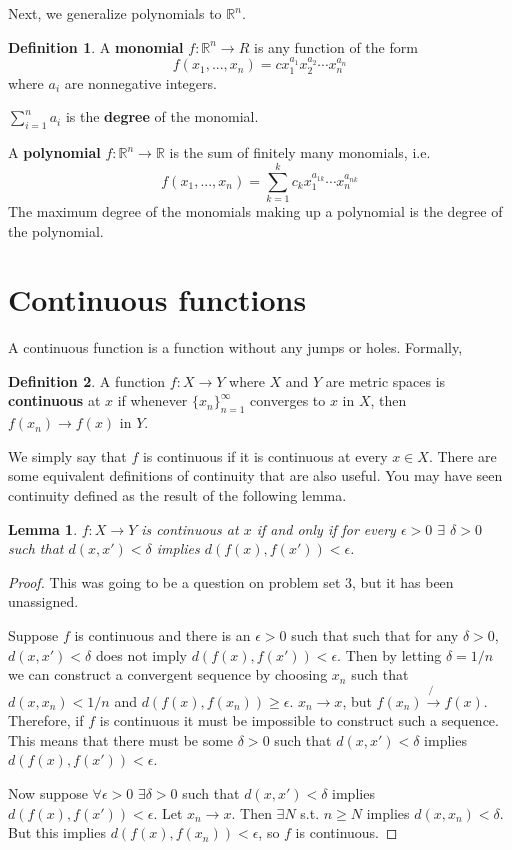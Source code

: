 \documentclass[12pt,reqno]{amsart}
\newtheorem{lemma}{Lemma}[section]
\theoremstyle{definition}
\newtheorem{definition}{Definition}[section]
\def\R{\mathbb{R}}
\newcommand{\seq}[1]{\{{#1}_n \}_{n=1}^\infty }
\renewcommand{\to}{{\rightarrow}}
\begin{document}
Next, we generalize polynomials to $\R^n$. 
\begin{definition}
  A \textbf{monomial} $f:\R^n \to R$ is any function of the form
  \[ f(x_1, ..., x_n) = c x_1^{a_1} x_2^{a_2} \cdots x_n^{a_n} \]
  where $a_i$ are nonnegative integers. 

  $\sum_{i=1}^n a_i$ is the \textbf{degree} of the monomial. 

  A \textbf{polynomial} $f:\R^n \to \R$ is the sum of finitely many
  monomials, i.e.
  \[ f(x_1, ..., x_n) = \sum_{k=1}^k c_k x_1^{a_{1k}}\cdots
  x_n^{a_{nk}} \]
  The maximum degree of the monomials making up a polynomial is the
  degree of the polynomial.
\end{definition}

\section{Continuous functions}

A continuous function is a function without any jumps or
holes. Formally,
\begin{definition}
  A function $f:X \to Y$ where $X$ and $Y$ are metric spaces is
  \textbf{continuous} at $x$ if whenever $\seq{x}$ converges to $x$ in
  $X$, then $f(x_n) \to f(x)$ in $Y$.  
\end{definition}
We simply say that $f$ is continuous if it is continuous at every $x
\in X$.  There are some equivalent definitions of continuity that are
also useful. You may have seen continuity defined as the result of the
following lemma.
\begin{lemma}\label{lem:ced}
  $f: X \to Y$ is continuous at $x$ if and only if for every
  $\epsilon>0$ $\exists$ $\delta >0$ such that $d(x,x') < \delta $
  implies $d(f(x),f(x')) < \epsilon$.
\end{lemma}
\begin{proof}
  This was going to be a question on problem set 3, but it has been
  unassigned. 
  
  Suppose $f$ is continuous and there is an $\epsilon>0$ such that
  such that for any $\delta>0$, $d(x,x') < \delta$ does not imply
  $d(f(x),f(x'))< \epsilon$. Then by letting $\delta = 1/n$ we can
  construct a convergent sequence by choosing $x_n$ such that
  $d(x,x_n) < 1/n$ and $d(f(x),f(x_n)) \geq \epsilon$. $x_n \to x$,
  but $f(x_n) \not\to f(x)$. Therefore, if $f$ is continuous it must
  be impossible to construct such a sequence. This means that there
  must be some $\delta>0$ such that $d(x,x') < \delta$ implies
  $d(f(x),f(x')) < \epsilon$.

  Now suppose $\forall \epsilon>0$ $\exists \delta>0$ such that
  $d(x,x')<\delta$ implies $d(f(x),f(x')) <\epsilon$. Let $x_n \to
  x$. Then $\exists N$ s.t. $n\geq N$ implies $d(x,x_n) < \delta$. But
  this implies $d(f(x),f(x_n)) < \epsilon$, so $f$ is continuous.
\end{proof}
\end{document}
